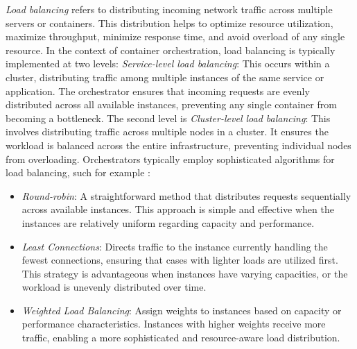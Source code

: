 \textit{Load balancing} refers to distributing incoming network traffic across
multiple servers or containers.
This distribution helps to optimize resource utilization, maximize throughput,
minimize response time, and avoid overload of any single resource.
In the context of container orchestration, load balancing is typically
implemented at two levels:
\textit{Service-level load balancing}: This occurs within a cluster,
distributing traffic among multiple instances of the same service or
application.
The orchestrator ensures that incoming requests are evenly distributed across
all available instances, preventing any single container from becoming a
bottleneck.
The second level is \textit{Cluster-level load balancing}: This involves
distributing traffic across multiple nodes in a cluster.
It ensures the workload is balanced across the entire infrastructure, preventing
individual nodes from overloading.
Orchestrators typically employ sophisticated algorithms for load balancing, such
for example \cite{Shafiq2022}:
\begin{itemize}
  \itemsep0em
    \item \textit{Round-robin}: A straightforward method that distributes
      requests sequentially across available instances.
      This approach is simple and effective when the instances are relatively
      uniform regarding capacity and performance.
    \item \textit{Least Connections}: Directs traffic to the instance currently
      handling the fewest connections, ensuring that cases with lighter loads
      are utilized first.
      This strategy is advantageous when instances have varying capacities, or
      the workload is unevenly distributed over time.
    \item \textit{Weighted Load Balancing}: Assign weights to instances based on
      capacity or performance characteristics. Instances with higher weights
      receive more traffic, enabling a more sophisticated and resource-aware
      load distribution.
    \end{itemize}

